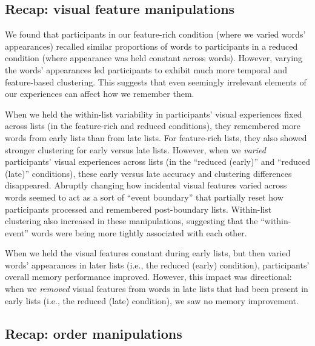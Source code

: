 \documentclass[11pt]{article}
\begin{document}

\subsection*{Recap: visual feature manipulations}

We found that participants in our feature-rich condition (where we varied
words' appearances) recalled similar proportions of words to participants in a
reduced condition (where appearance was held constant across words). However,
varying the words' appearances led participants to exhibit much more temporal
and feature-based clustering. This suggests that even seemingly irrelevant
elements of our experiences can affect how we remember them.

When we held the within-list variability in participants' visual experiences
fixed across lists (in the feature-rich and reduced conditions), they
remembered more words from early lists than from late lists. For feature-rich
lists, they also showed stronger clustering for early versus late lists.
However, when we \textit{varied} participants' visual experiences across lists
(in the ``reduced (early)'' and ``reduced (late)'' conditions), these early
versus late accuracy and clustering differences disappeared. Abruptly changing
how incidental visual features varied across words seemed to act as a sort of
``event boundary'' that partially reset how participants processed and
remembered post-boundary lists. Within-list clustering also increased in these
manipulations, suggesting that the ``within-event'' words were being more tightly
associated with each other.

When we held the visual features constant during early lists, but then varied
words' appearances in later lists (i.e., the reduced (early) condition),
participants' overall memory performance improved. However, this impact was
directional: when we \textit{removed} visual features from words in late lists
that had been present in early lists (i.e., the reduced (late) condition), we
saw no memory improvement.

\subsection*{Recap: order manipulations}
\end{document}
